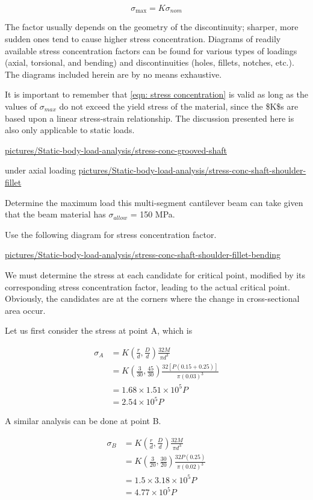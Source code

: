 \documentclass[a4paper,openany,12pt]{book}
\begin{document}
$$\sigma _{\max } = K\sigma _{nom}$$

The factor usually depends on the geometry of the discontinuity;
sharper, more sudden ones tend to cause higher stress concentration.
Diagrams of readily available stress concentration factors can be found
for various types of loadings (axial, torsional, and bending) and
discontinuities (holes, fillets, notches, etc.). The diagrams included
herein are by no means exhaustive.

It is important to remember that
\ref{eqn: stress concentration} is valid as
long as the values of \(\sigma_{max}\) do not exceed the yield stress of
the material, since the \$K\$s are based upon a linear stress-strain
relationship. The discussion presented here is also only applicable to
static loads.


\cite{juvinall2006fundamentals}
\url{pictures/Static-body-load-analysis/stress-conc-grooved-shaft}


under axial loading \cite{juvinall2006fundamentals}
\url{pictures/Static-body-load-analysis/stress-conc-shaft-shoulder-fillet}

Determine the maximum load this multi-segment cantilever beam can take
given that the beam material has \(\sigma_{allow}\) = 150 MPa.


Use the following diagram for stress concentration factor.


\url{pictures/Static-body-load-analysis/stress-conc-shaft-shoulder-fillet-bending}

We must determine the stress at each candidate for critical point,
modified by its corresponding stress concentration factor, leading to
the actual critical point. Obviously, the candidates are at the corners
where the change in cross-sectional area occur.

Let us first consider the stress at point A, which is

$$\begin{aligned}
    \sigma_A &= K(\frac{r}{d}, \frac{D}{d}) \frac{32M}{\pi d^3} \\
             &= K(\frac{3}{30}, \frac{45}{30}) \frac{32[P(0.15 + 0.25)]}{\pi (0.03)^3} \\
             &= 1.68 \times 1.51 \times 10^5 P \\
             &= 2.54 \times 10^5 P
  \end{aligned}$$

A similar analysis can be done at point B.

$$\begin{aligned}
    \sigma_B &= K(\frac{r}{d}, \frac{D}{d}) \frac{32M}{\pi d^3} \\
             &= K(\frac{3}{20}, \frac{30}{20}) \frac{32P(0.25)}{\pi (0.02)^3} \\
             &= 1.5 \times 3.18 \times 10^5 P \\
             &= 4.77 \times 10^5 P
  \end{aligned}$$
\end{document}
